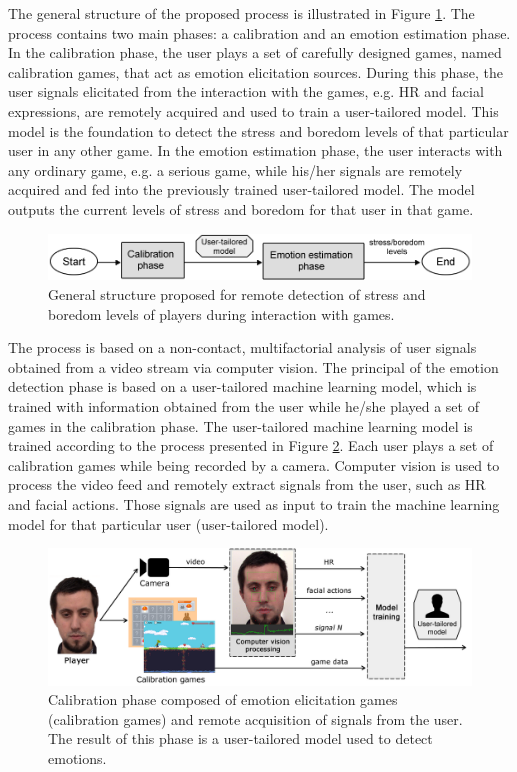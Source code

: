 The general structure of the proposed process is illustrated in Figure \ref{fig:research-aim-general}. The process contains two main phases: a calibration and an emotion estimation phase. In the calibration phase, the user plays a set of carefully designed games, named calibration games, that act as emotion elicitation sources. During this phase, the user signals elicitated from the interaction with the games, e.g. HR and facial expressions, are remotely acquired and used to train a user-tailored model. This model is the foundation to detect the stress and boredom levels of that particular user in any other game. In the emotion estimation phase, the user interacts with any ordinary game, e.g. a serious game, while his/her signals are remotely acquired and fed into the previously trained user-tailored model. The model outputs the current levels of stress and boredom for that user in that game.

\begin{figure}[h!]
    \centering
    \includegraphics[width=\textwidth]{figures/research-aim-general.png}
    \caption{General structure proposed for remote detection of stress and boredom levels of players during interaction with games.}
    \label{fig:research-aim-general}
\end{figure}

The process is based on a non-contact, multifactorial analysis of user signals obtained from a video stream via computer vision. The principal of the emotion detection phase is based on a user-tailored machine learning model, which is trained with information obtained from the user while he/she played a set of games in the calibration phase. The user-tailored machine learning model is trained according to the process presented in Figure \ref{fig:user-tailored-calibration}. Each user plays a set of calibration games while being recorded by a camera. Computer vision is used to process the video feed and remotely extract signals from the user, such as HR and facial actions. Those signals are used as input to train the machine learning model for that particular user (user-tailored model).

\begin{figure}[h]
    \centering
    \includegraphics[width=\textwidth]{figures/user-tailored-calibration.png}
    \caption{Calibration phase composed of emotion elicitation games (calibration games) and remote acquisition of signals from the user. The result of this phase is a user-tailored model used to detect emotions.}
    \label{fig:user-tailored-calibration}
\end{figure}

